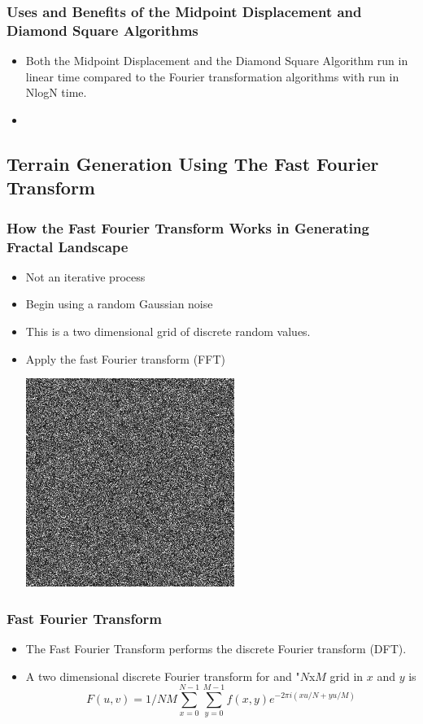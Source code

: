 \documentclass{beamer}
\begin{document}
\begin{frame}
\frametitle{Uses and Benefits of the Midpoint Displacement and Diamond Square Algorithms}
\begin{itemize}
\item Both the Midpoint Displacement and the Diamond Square Algorithm run in linear time compared to the Fourier transformation algorithms with run in NlogN time.
\item
\end {itemize}
\end{frame}

\subsection{Terrain Generation Using The Fast Fourier Transform}

\begin{frame}
 \frametitle{How the Fast Fourier Transform Works in Generating Fractal Landscape}
\begin{itemize}
\item Not an iterative process
\item Begin using a random Gaussian noise
\item This is a two dimensional grid of discrete random values. 
\item Apply the fast Fourier transform (FFT)
\begin{center}
\includegraphics[scale=0.3]{fft2d.jpg}
\end{center}
\end{itemize}
\end{frame}

\begin{frame}
\frametitle{Fast Fourier Transform}
\begin{itemize}
\item The Fast Fourier Transform performs the discrete Fourier transform (DFT). 
\item A two dimensional discrete Fourier transform for and "$N$x$M$ grid in $x$ and $y$ is 
	$$F(u,v)=1/NM\displaystyle\sum\limits_{x=0}^{N-1} \displaystyle\sum\limits_{y=0}^{M-1} f(x,y)e^{-2\pi i(xu/N+yu/M)}$$
\end{itemize}
\end{frame}
\end{document}
